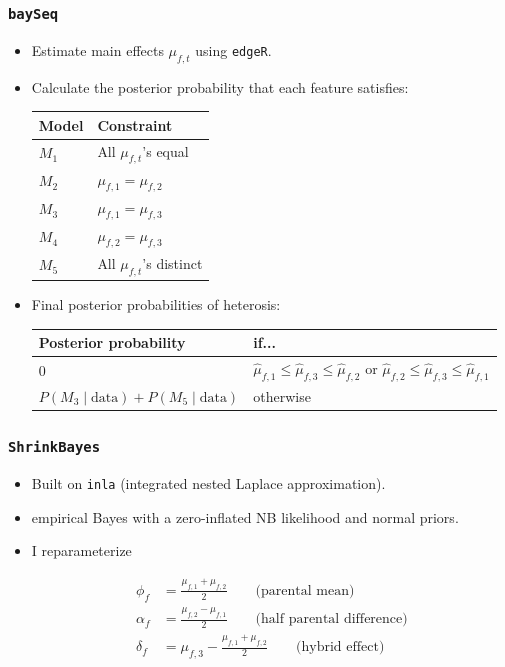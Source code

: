 \documentclass{beamer}
\providecommand{\wh}[1]{\widehat{#1}}
\numberwithin{equation}{section}
\begin{document}
\begin{frame}
\frametitle{{\tt baySeq}}
\begin{itemize}
\item Estimate main effects $\mu_{f, t}$ using {\tt edgeR}.
\pause \item Calculate the posterior probability that each feature satisfies:

\begin{center}
\begin{tabular}{l|l}
Model & Constraint \\ \hline
$M_1$ & All $\mu_{f, t}$'s equal \\
$M_2$ &  $\mu_{f, 1} = \mu_{f, 2}$ \\
$M_3$ & $\mu_{f, 1} = \mu_{f, 3}$ \\
$M_4$ & $\mu_{f, 2} = \mu_{f, 3}$ \\
$M_5$ &  All $\mu_{f, t}$'s distinct
\end{tabular}
\end{center}

\pause \item Final posterior probabilities of heterosis:
\begin{center}
\begin{tabular}{l|p{4cm}}
Posterior probability & if... \\ \hline
0 & $\wh{\mu}_{f, 1} \le \wh{\mu}_{f, 3} \le \wh{\mu}_{f, 2}$ or $\wh{\mu}_{f, 2} \le \wh{\mu}_{f, 3} \le \wh{\mu}_{f, 1}$ \\
$P(M_3 \mid \text{data}) + P(M_5 \mid \text{data})$ & otherwise
\end{tabular}
\end{center}

\end{itemize}
\end{frame}


\begin{frame}
\frametitle{{\tt ShrinkBayes}}
\begin{itemize}
\item Built on {\tt inla} (integrated nested Laplace approximation).
\pause \item empirical Bayes with a zero-inflated NB likelihood and normal priors.
\pause \item I reparameterize

\begin{align*}
\phi_f &= \frac{\mu_{f, 1} + \mu_{f, 2}}{2} \qquad \text{(parental mean)} \\
\alpha_f &= \frac{\mu_{f, 2} - \mu_{f, 1}}{2} \qquad \text{(half parental difference)} \\
\delta_f &= \mu_{f, 3} - \frac{\mu_{f, 1} + \mu_{f, 2}}{2} \qquad \text{(hybrid effect)} 
\end{align*}
\end{itemize}
\end{frame}
\end{document}
